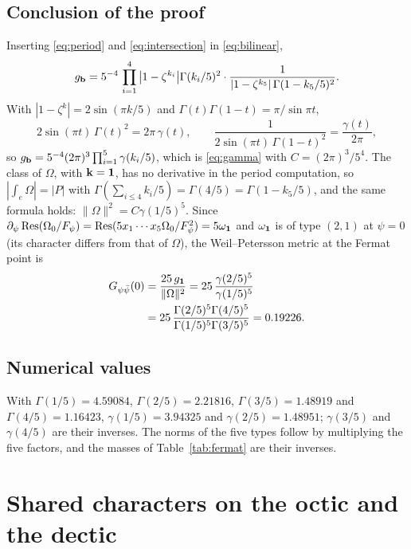 \subsection{Conclusion of the proof}

Inserting \eqref{eq:period} and \eqref{eq:intersection} in
\eqref{eq:bilinear},
\[
g_{\mathbf{b}}=5^{-4}\,\prod_{i=1}^4\big|1-\zeta^{k_i}\big|\Gamma(k_i/5)^2\cdot
\frac{1}{|1-\zeta^{k_5}|\,\Gamma(1-k_5/5)^2}.
\]
With $|1-\zeta^k|=2\sin(\pi k/5)$ and $\Gamma(t)\Gamma(1-t)=\pi/\sin\pi t$,
\[
2\sin(\pi t)\,\Gamma(t)^2=2\pi\,\gamma(t),\qquad
\frac{1}{2\sin(\pi t)\,\Gamma(1-t)^2}=\frac{\gamma(t)}{2\pi},
\]
so $g_{\mathbf{b}}=5^{-4}(2\pi)^3\prod_{i=1}^5\gamma(k_i/5)$, which is
\eqref{eq:gamma} with $C=(2\pi)^3/5^4$. The class of $\Omega$, with
$\mathbf k=\mathbf{1}$, has no derivative in the period computation, so
$|\int_e\Omega|=|P|$ with $\Gamma(\sum_{i\le4}k_i/5)=\Gamma(4/5)=
\Gamma(1-k_5/5)$, and the same formula holds: $\|\Omega\|^2=C\gamma(1/5)^5$.
Since $\partial_\psi\operatorname{Res}(\Omega_0/F_\psi)=\operatorname{Res}(5x_1\cdots x_5\Omega_0/
F_\psi^2)=5\omega_{\mathbf{1}}$ and $\omega_{\mathbf{1}}$ is of type $(2,1)$ at
$\psi=0$ (its character differs from that of $\Omega$), the
Weil--Petersson metric at the Fermat point is
\begin{align*}
G_{\psi\bar\psi}(0)&=\frac{25\,g_{\mathbf{1}}}{\|\Omega\|^2}
=25\,\frac{\gamma(2/5)^5}{\gamma(1/5)^5}\\
&=25\,\frac{\Gamma(2/5)^5\Gamma(4/5)^5}{\Gamma(1/5)^5\Gamma(3/5)^5}=0.19226.
\end{align*}

\subsection{Numerical values}

With $\Gamma(1/5)=4.59084$, $\Gamma(2/5)=2.21816$, $\Gamma(3/5)=1.48919$
and $\Gamma(4/5)=1.16423$, $\gamma(1/5)=3.94325$ and $\gamma(2/5)=1.48951$;
$\gamma(3/5)$ and $\gamma(4/5)$ are their inverses. The norms of the
five types follow by multiplying the five factors, and the masses of
Table~\ref{tab:fermat} are their inverses.

\section{Shared characters on the octic and the dectic}\label{app:wlabels}

